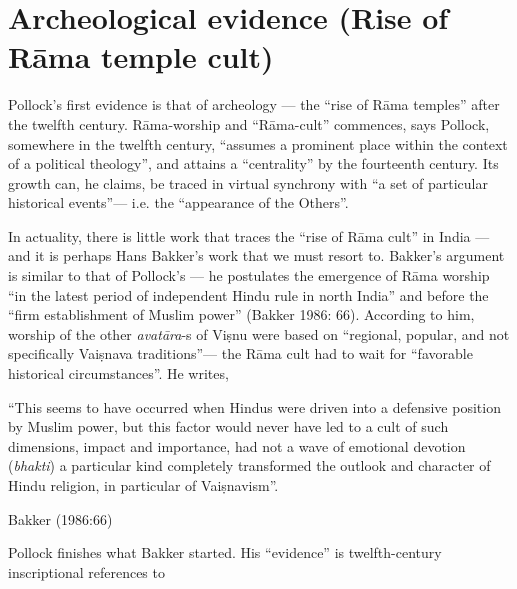 \section{Archeological evidence (Rise of Rāma temple cult)}\label{sec3.1}

Pollock’s first evidence is that of archeology — the “rise of Rāma temples” after the twelfth century. Rāma-worship and “Rāma-cult” commences, says Pollock, somewhere in the twelfth century, “assumes a prominent place within the context of a political theology”, and attains a “centrality” by the fourteenth century. Its growth can, he claims, be traced in virtual synchrony with “a set of particular historical events”— i.e. the “appearance of the Others”. 

In actuality, there is little work that traces the “rise of Rāma cult” in India — and it is perhaps Hans Bakker’s work that we must resort to. Bakker’s argument is similar to that of Pollock’s — he postulates the emergence of Rāma worship “in the latest period of independent Hindu rule in north India” and before the “firm establishment of Muslim power” (Bakker 1986: 66). According to him, worship of the other {\sl avatāra}-s of Viṣnu were based on “regional, popular, and not specifically Vaiṣnava traditions”— the Rāma cult had to wait for “favorable historical circumstances”. He writes,  

\begin{myquote}
“This seems to have occurred when Hindus were driven into a defensive position by Muslim power, but this factor would never have led to a cult of such dimensions, impact and importance, had not a wave of emotional devotion ({\sl bhakti}) a particular kind completely transformed the outlook and character of Hindu religion, in particular of Vaiṣnavism”.

\hfill Bakker (1986:66)
\end{myquote}

Pollock finishes what Bakker started. His “evidence” is twelfth-century inscriptional references to 

